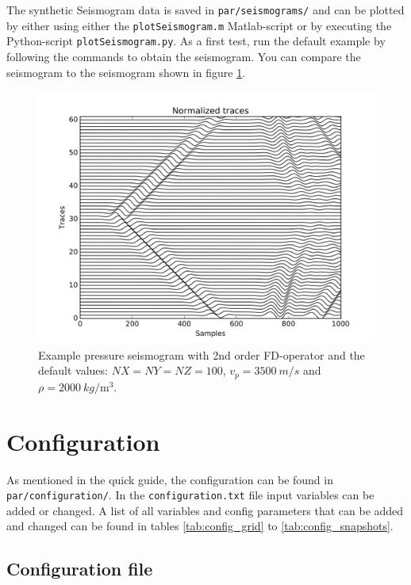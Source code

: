 \documentclass[pdftex,a4paper,parskip,listof=totoc,bibliography=totoc,onehalfspacing,12pt]{scrreprt}
\newcommand{\shellcmd}[1]{\indent\indent\texttt{#1}}	%
\begin{document}
The synthetic Seismogram data is saved in \shellcmd{par/seismograms/} and can be plotted by either using either the \shellcmd{plotSeismogram.m} Matlab-script or by executing the Python-script \shellcmd{plotSeismogram.py}.
As a first test, run the default example by following the commands to obtain the seismogram. You can compare the seismogram to the seismogram shown in figure \ref{fig:Seismogram}.

\begin{figure}[h!]
\centering
	\includegraphics[width = .8\textwidth]{images/Test_Seismogram.png}
	\caption[Example pressure seismogram.]{Example pressure seismogram with 2nd order FD-operator and the default values: $NX=NY=NZ=100$, $v_p=\SI{3500}{m\per s}$ and $\rho = \SI{2000}{kg\per\cubic\metre}$.}\label{fig:Seismogram}
\end{figure}

\section{Configuration}\label{sec:config}
As mentioned in the quick guide, the configuration can be found in \shellcmd{par/configuration/}. In the \shellcmd{configuration.txt} file input variables can be added or changed. A list of all variables and config parameters that can be added and changed can be found in tables \ref{tab:config_grid} to \ref{tab:config_snapshots}.

\subsection{Configuration file}
\end{document}
